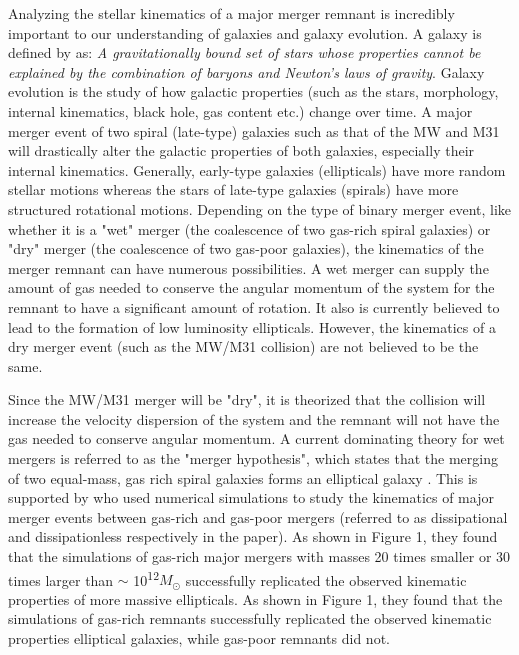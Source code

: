 \documentclass[twocolumn]{aastex63}
\begin{document}
Analyzing the stellar kinematics of a major merger remnant is incredibly important to our understanding of galaxies and galaxy evolution.  A galaxy is defined by \cite{2012AJ....144...76W} as: \textit{A gravitationally bound set of stars whose properties cannot be explained by the combination of baryons and Newton's laws of gravity}.  Galaxy evolution is the study of how galactic properties (such as the stars, morphology, internal kinematics, black hole, gas content etc.) change over time. A major merger event of two spiral (late-type) galaxies such as that of the MW and M31 will drastically alter the galactic properties of both galaxies, especially their internal kinematics.  Generally, early-type galaxies (ellipticals) have more random stellar motions whereas the stars of late-type galaxies (spirals) have more structured rotational motions.  Depending on the type of binary merger event, like whether it is a "wet" merger (the coalescence of two gas-rich spiral galaxies) or "dry" merger (the coalescence of two gas-poor galaxies), the kinematics of the merger remnant can have numerous possibilities.  A wet merger can supply the amount of gas needed to conserve the angular momentum of the system for the remnant to have a significant amount of rotation.  It also is currently believed to lead to the formation of low luminosity ellipticals.   However, the kinematics of a dry merger event (such as the MW/M31 collision) are not believed to be the same.        

Since the MW/M31 merger will be "dry", it is theorized that the collision will increase the velocity dispersion of the system and the remnant will not have the gas needed to conserve angular momentum.  A current dominating theory for wet mergers is referred to as the "merger hypothesis", which states that the merging of two equal-mass, gas rich spiral galaxies forms an elliptical galaxy \citep{1972ApJ...178..623T}.  This is supported by \cite{2006ApJ...650..791C} who used numerical simulations to study the kinematics of major merger events between gas-rich and gas-poor mergers (referred to as dissipational and dissipationless respectively in the paper).  As shown in Figure 1, they found that the simulations of gas-rich major mergers with masses 20 times smaller or 30 times larger than $\sim$ 10\textsuperscript{12}$M_{\odot}$ successfully replicated the observed kinematic properties of more massive ellipticals.  As shown in Figure 1, they found that the simulations of gas-rich remnants successfully replicated the observed kinematic properties elliptical galaxies, while gas-poor remnants did not. 
\end{document}
